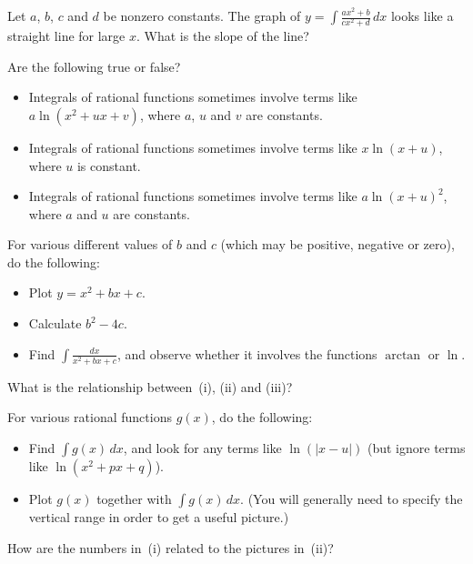 \documentclass[a4paper,10pt]{amsbook}
\begin{document}
\begin{exercise}
 Let $a$, $b$, $c$ and $d$ be nonzero constants.  The graph
 of $\displaystyle y=\int\frac{ax^2+b}{cx^2+d}\,dx$ looks
 like a straight line for large $x$.  What is the slope of
 the line?
\end{exercise}

\begin{exercise}
 Are the following true or false?
 \begin{itemize}
  \item[(a)] Integrals of rational functions sometimes
   involve terms like $a\ln(x^2+ux+v)$, where $a$, $u$ and
   $v$ are constants.
  \item[(b)] Integrals of rational functions sometimes
   involve terms like $x\ln(x+u)$, where $u$ is constant.
  \item[(c)] Integrals of rational functions sometimes
   involve terms like $a\ln(x+u)^2$, where $a$ and $u$ are
   constants. 
 \end{itemize}
\end{exercise}

\begin{exercise}
 For various different values of $b$ and $c$ (which may be
 positive, negative or zero), do the following:
 \begin{itemize}
  \item[(i)] Plot $y=x^2+bx+c$.
  \item[(ii)] Calculate $b^2-4c$.
  \item[(iii)] Find $\displaystyle\int\frac{dx}{x^2+bx+c}$,
   and observe whether it involves the functions $\arctan$
   or $\ln$. 
 \end{itemize}
 What is the relationship between~(i), (ii) and (iii)?
\end{exercise}

\begin{exercise}
 For various rational functions $g(x)$, do the following:
 \begin{itemize}
  \item[(i)] Find $\int g(x)\,dx$, and look for any terms
   like $\ln(|x-u|)$ (but ignore terms like $\ln(x^2+px+q)$).
  \item[(ii)] Plot $g(x)$ together with $\int g(x)\,dx$.
   (You will generally need to specify the vertical range in
   order to get a useful picture.)
 \end{itemize}
 How are the numbers in~(i) related to the pictures in~(ii)?  
\end{exercise}
\end{document}
